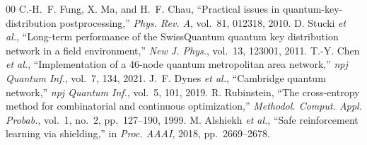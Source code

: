 \documentclass[conference,a4paper]{IEEEtran}
\begin{document}
\begin{thebibliography}{00}
 C.-H.~F. Fung, X. Ma, and H.~F. Chau, ``Practical issues in quantum-key-distribution postprocessing,'' \emph{Phys. Rev. A}, vol.~81, 012318, 2010.
 D. Stucki \emph{et al.}, ``Long-term performance of the SwissQuantum quantum key distribution network in a field environment,'' \emph{New J. Phys.}, vol.~13, 123001, 2011.
 T.-Y. Chen \emph{et al.}, ``Implementation of a 46-node quantum metropolitan area network,'' \emph{npj Quantum Inf.}, vol.~7, 134, 2021.
 J.~F. Dynes \emph{et al.}, ``Cambridge quantum network,'' \emph{npj Quantum Inf.}, vol.~5, 101, 2019.
 R. Rubinstein, ``The cross-entropy method for combinatorial and continuous optimization,'' \emph{Methodol. Comput. Appl. Probab.}, vol.~1, no.~2, pp.~127--190, 1999.
 M. Alshiekh \emph{et al.}, ``Safe reinforcement learning via shielding,'' in \emph{Proc. AAAI}, 2018, pp.~2669--2678.
\end{thebibliography}
\end{document}
